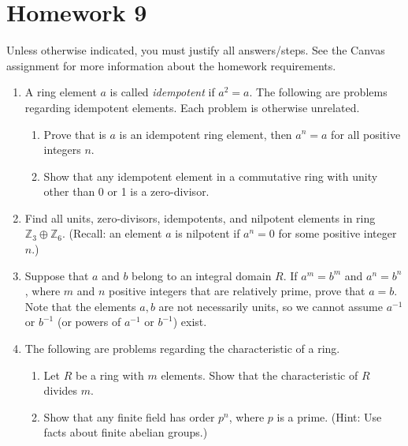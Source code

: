 \documentclass{article}
\newcommand{\ZZ}{\mathbb{Z}}
\newcommand{\inv}{^{-1}}
\begin{document}
\section*{Homework 9}

Unless otherwise indicated, you must justify all answers/steps. See the Canvas assignment for more information about the homework requirements. 

\begin{enumerate}
    
    \item A ring element $a$ is called \emph{idempotent} if $a^2=a$. The following are problems regarding idempotent elements. Each problem is otherwise unrelated.
    \begin{enumerate}
        \item Prove that is $a$ is an idempotent ring element, then $a^n=a$ for all positive integers $n$. 
        
        \item Show that any idempotent element in a commutative ring with unity other than 0 or 1 is a zero-divisor. 

    \end{enumerate}

    \item Find all units, zero-divisors, idempotents, and nilpotent elements in ring $\ZZ_3\oplus \ZZ_6$. (Recall: an element $a$ is nilpotent if $a^n=0$ for some positive integer $n$.)

    
    \item Suppose that $a$ and $b$ belong to an integral domain $R$. If $a^m=b^m$ and $a^n=b^n$, where $m$ and $n$ positive integers that are relatively prime, prove that $a=b$. Note that the elements $a,b$ are not necessarily units, so we cannot assume $a\inv$ or $b\inv$  (or powers of $a\inv$ or $b\inv$) exist.
    
    \item The following are problems regarding the characteristic of a ring. 
    \begin{enumerate}
        \item Let $R$ be a ring with $m$ elements. Show that the characteristic of $R$ divides $m$. 
         
        \item Show that any finite field has order $p^n$, where $p$ is a prime. (Hint: Use facts about finite abelian groups.)
        
    \end{enumerate}

\end{enumerate}
\end{document}
